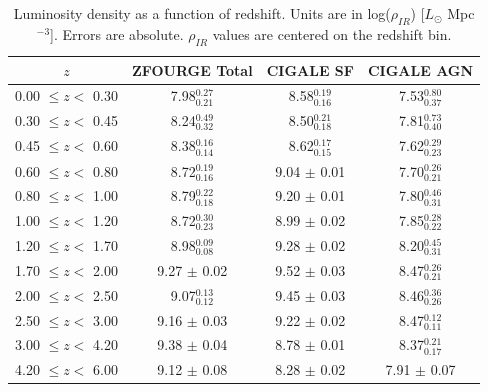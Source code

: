 \begin{table}[h]
    \begin{center}
    \caption{Luminosity density as a function of redshift. Units are in log($\rho_{IR}$) [$L_{\odot}$ Mpc$^{-3}$]. Errors are absolute. $\rho_{IR}$ values are centered on the redshift bin.}
    \label{Tab: SFRD}
    \begin{tabular}{@{}cccc@{}}
        \toprule
        $z$ & ZFOURGE Total & CIGALE SF & CIGALE AGN \\
        \hline
        0.00 $\leq z <$ 0.30 & 7.98$^{0.27}_{0.21}$ & 8.58$^{0.19}_{0.16}$  & 7.53$^{0.80}_{0.37}$ \\
        0.30 $\leq z <$ 0.45 & 8.24$^{0.49}_{0.32}$ & 8.50$^{0.21}_{0.18}$  & 7.81$^{0.73}_{0.40}$ \\
        0.45 $\leq z <$ 0.60 & 8.38$^{0.16}_{0.14}$ & 8.62$^{0.17}_{0.15}$  & 7.62$^{0.29}_{0.23}$ \\
        0.60 $\leq z <$ 0.80 & 8.72$^{0.19}_{0.16}$ & 9.04 $\pm$ 0.01       & 7.70$^{0.26}_{0.21}$ \\
        0.80 $\leq z <$ 1.00 & 8.79$^{0.22}_{0.18}$ & 9.20 $\pm$ 0.01       & 7.80$^{0.46}_{0.31}$ \\
        1.00 $\leq z <$ 1.20 & 8.72$^{0.30}_{0.23}$ & 8.99 $\pm$ 0.02       & 7.85$^{0.28}_{0.22}$ \\
        1.20 $\leq z <$ 1.70 & 8.98$^{0.09}_{0.08}$ & 9.28 $\pm$ 0.02       & 8.20$^{0.45}_{0.31}$ \\
        1.70 $\leq z <$ 2.00 & 9.27 $\pm$ 0.02      & 9.52 $\pm$ 0.03       & 8.47$^{0.26}_{0.21}$ \\
        2.00 $\leq z <$ 2.50 & 9.07$^{0.13}_{0.12}$ & 9.45 $\pm$ 0.03       & 8.46$^{0.36}_{0.26}$ \\
        2.50 $\leq z <$ 3.00 & 9.16 $\pm$ 0.03      & 9.22 $\pm$ 0.02       & 8.47$^{0.12}_{0.11}$ \\
        3.00 $\leq z <$ 4.20 & 9.38 $\pm$ 0.04      & 8.78 $\pm$ 0.01       & 8.37$^{0.21}_{0.17}$ \\
        4.20 $\leq z <$ 6.00 & 9.12 $\pm$ 0.08      & 8.28 $\pm$ 0.02       & 7.91 $\pm$ 0.07 
        \botrule
    \end{tabular}
    \end{center}        
\end{table}

